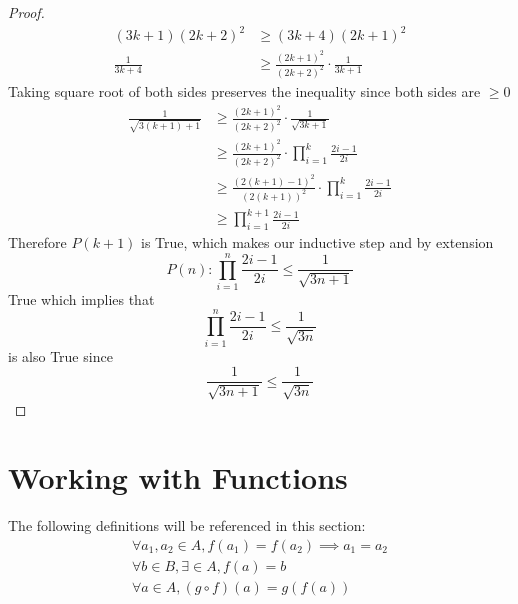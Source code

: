 \documentclass[12pt]{article}
\theoremstyle{definition}
\begin{document}
\begin{enumerate}
\begin{proof}
\begin{align*}
            (3k+1)(2k+2)^{2} &\geq (3k+4)(2k+1)^{2} \tag{by factoring each side}\\ 
            \frac{1}{3k+4} &\geq \frac{(2k+1)^{2}}{(2k+2)^{2}} \cdot \frac{1}{3k+1}
        \end{align*}
        Taking square root of both sides preserves the inequality since both sides are $\geq 0$ 
        \begin{align*}
            \frac{1}{\sqrt{3(k+1)+1}} &\geq \frac{(2k+1)^{2}}{(2k+2)^{2}} \cdot \frac{1}{\sqrt{3k+1}} \\
            &\geq \frac{(2k+1)^{2}}{(2k+2)^{2}} \cdot \prod_{i=1}^{k}\frac{2i-1}{2i} \tag{Using Induction Hypothesis} \\ 
            &\geq \frac{(2(k+1)-1)^{2}}{(2(k+1))^{2}} \cdot \prod_{i=1}^{k}\frac{2i-1}{2i} \\
            &\geq \prod_{i=1}^{k+1}\frac{2i-1}{2i} \tag{combining the terms into a single product}
        \end{align*}
        Therefore $P(k+1)$ is True, which makes our inductive step and by extension $$P(n): \prod_{i=1}^{n}\frac{2i-1}{2i} \leq \frac{1}{\sqrt{3n+1}}$$ True which implies that $$\prod_{i=1}^{n}\frac{2i-1}{2i} \leq \frac{1}{\sqrt{3n}}$$ is also True since $$\frac{1}{\sqrt{3n+1}} \leq \frac{1}{\sqrt{3n}}$$
    \end{proof}
\end{enumerate}

\newpage
\section{Working with Functions}
    \setcounter{equation}{0}
    \setcounter{case}{0}
    The following definitions will be referenced in this section:
    \begin{align}
        \forall a_1, a_2 \in A, f(a_1) = f(a_2) \implies a_1 = a_2\tag{one-to-one}\\
        \forall b \in B, \exists \in A, f(a) = b\tag{onto}\\
        \forall a \in A, (g\circ f)(a) = g(f(a))\tag{composition}
    \end{align}
    
\end{document}
